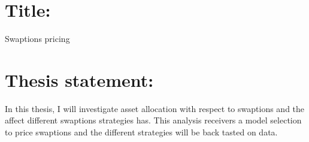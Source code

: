 \documentclass{article}
\begin{document}
\section*{Title: }
Swaptions pricing 
\section*{Thesis statement: }
In this thesis, I will investigate asset allocation with respect to swaptions and the affect different swaptions strategies has.
This analysis receivers a model selection to price swaptions and the different strategies will be back tasted on data.
\end{document}
